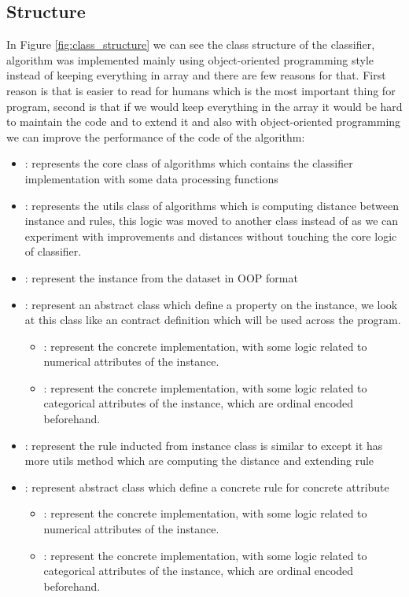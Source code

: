\documentclass{article}
\begin{document}
\subsection{Structure}
In Figure \ref{fig:class_structure} we can see the class structure of the classifier, algorithm was implemented mainly 
using object-oriented programming \cite{rentsch1982object} style instead of keeping everything in array and there are few reasons for that. First
reason is that is easier to read for humans which is the most important thing for program, second is that if we would keep everything
in the array it would be hard to maintain the code and to extend it and also with object-oriented programming we can improve the 
performance of the code of the algorithm: 

\begin{itemize}
    \item {}: represents the core class of algorithms which contains the classifier implementation with some 
    data processing functions
    \item {}: represents the utils class of algorithms which is computing distance between instance and rules, this logic
    was moved to another class instead of  as we can experiment with improvements and distances without touching the
    core logic of classifier.
    \item {}: represent the instance from the dataset in OOP format
    \item {}: represent an abstract class which define a property on the instance, we look at this 
    class like an contract definition which will be used across the program.
        \begin{itemize}
        \item {}: represent the concrete implementation, with some 
        logic related to numerical attributes of the instance.
        \item {}: represent the concrete implementation, with some 
        logic related to categorical attributes of the instance, which are ordinal encoded beforehand.
        \end{itemize}
    \item {}: represent the rule inducted from instance class is similar to 
    except it has more utils method which are computing the distance and extending rule
    \item {}: represent abstract class which define a concrete rule for concrete
    attribute
    \begin{itemize}
        \item {}: represent the concrete implementation, with some 
        logic related to numerical attributes of the instance.
        \item {}: represent the concrete implementation, with some 
        logic related to categorical attributes of the instance, which are ordinal encoded beforehand.
        \end{itemize}
  \end{itemize}
\end{document}
